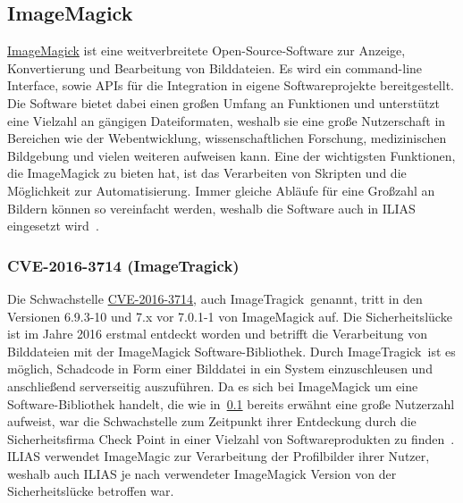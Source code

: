 \documentclass[10pt, a4paper,onecolumn ,titlepage]{article}
\begin{document}
    \subsection{ImageMagick}
    \label{subsec:ImageMagick}
    \href{https://imagemagick.org}{ImageMagick} ist eine weitverbreitete Open-Source-Software zur Anzeige, Konvertierung und Bearbeitung von Bilddateien.
    Es wird ein command-line Interface, sowie APIs für die Integration in eigene Softwareprojekte bereitgestellt.
    Die Software bietet dabei einen großen Umfang an Funktionen und unterstützt eine Vielzahl an gängigen Dateiformaten, weshalb sie eine große Nutzerschaft in Bereichen wie der Webentwicklung, wissenschaftlichen Forschung, medizinischen Bildgebung und vielen weiteren aufweisen kann.
    Eine der wichtigsten Funktionen, die ImageMagick zu bieten hat, ist das Verarbeiten von Skripten und die Möglichkeit zur Automatisierung.
    Immer gleiche Abläufe für eine Großzahl an Bildern können so vereinfacht werden, weshalb die Software auch in ILIAS eingesetzt wird~\parencite{imagemagick}.


    \subsubsection{CVE-2016-3714 (ImageTragick)}
    \label{subsubsec:CVE-2016-3714}
    Die Schwachstelle \href{https://www.cvedetails.com/cve/CVE-2016-3714/}{CVE-2016-3714}, auch \glqq ImageTragick\grqq\ genannt, tritt in den Versionen 6.9.3-10 und 7.x vor 7.0.1-1 von ImageMagick auf.
    Die Sicherheitslücke ist im Jahre 2016 erstmal entdeckt worden und betrifft die Verarbeitung von Bilddateien mit der ImageMagick Software-Bibliothek.
    Durch \glqq ImageTragick\grqq\ ist es möglich, Schadcode in Form einer Bilddatei in ein System einzuschleusen und anschließend serverseitig auszuführen.
    Da es sich bei ImageMagick um eine Software-Bibliothek handelt, die wie in~\ref{subsec:ImageMagick} bereits erwähnt eine große Nutzerzahl aufweist, war die Schwachstelle zum Zeitpunkt ihrer Entdeckung durch die Sicherheitsfirma Check Point in einer Vielzahl von Softwareprodukten zu finden~\parencite{imageTragicReport}.
    ILIAS verwendet ImageMagic zur Verarbeitung der Profilbilder ihrer Nutzer, weshalb auch ILIAS je nach verwendeter ImageMagick Version von der Sicherheitslücke betroffen war.
\end{document}
